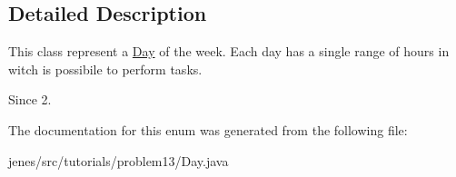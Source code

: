 \subsection{Detailed Description}
This class represent a \hyperlink{enumjenes_1_1tutorials_1_1problem13_1_1_day}{Day} of the week. Each day has a single range of hours in witch is possibile to perform tasks.

\begin{DoxySince}{Since}
2. 
\end{DoxySince}


The documentation for this enum was generated from the following file\-:\begin{DoxyCompactItemize}
\item 
jenes/src/tutorials/problem13/Day.\-java\end{DoxyCompactItemize}
